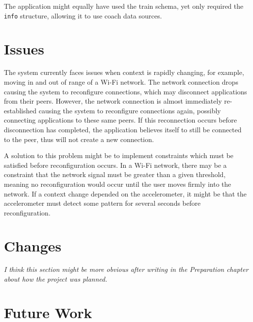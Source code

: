 \documentclass[12pt,twoside,notitlepage]{report}
\begin{document}
The application might equally have used the train schema, yet only required the {\tt info} structure, allowing it to use coach data sources.

\section{Issues}
The system currently faces issues when context is rapidly changing, for example, moving in and out of range of a Wi-Fi network. 
The network connection drops causing the system to reconfigure connections, which may disconnect applications from their peers.
However, the network connection is almost immediately re-established causing the system to reconfigure connections again, possibly connecting applications to these same peers. 
If this reconnection occurs before disconnection has completed, the application believes itself to still be connected to the peer, thus will not create a new connection.

A solution to this problem might be to implement constraints which must be satisfied before reconfiguration occurs. 
In a Wi-Fi network, there may be a constraint that the network signal must be greater than a given threshold, meaning no reconfiguration would occur until the user moves firmly into the network. 
If a context change depended on the accelerometer, it might be that the accelerometer must detect some pattern for several seconds before reconfiguration.

\section{Changes}
{\sl I think this section might be more obvious after writing in the Preparation chapter about how the project was planned. }


\section{Future Work}
\end{document}
